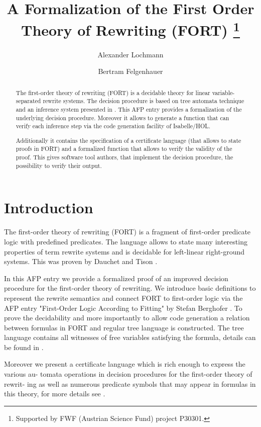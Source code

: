 \documentclass[11pt,a4paper]{article}
\begin{document}
\title{A Formalization of the First Order Theory of Rewriting (FORT) \footnote{Supported by FWF (Austrian Science Fund) project P30301.}}
\author{Alexander Lochmann \and Bertram Felgenhauer}
\maketitle

\begin{abstract}
The first-order theory of rewriting (FORT) is a decidable theory for
linear variable-separated rewrite systems. The decision
procedure is based on tree automata technique and an inference system presented in \cite{MLMF21}.
This AFP entry provides a formalization of the underlying decision procedure.
Moreover it allows to generate a function that can verify each inference step via the
code generation facility of Isabelle/HOL.

Additionally it contains the specification of a certificate language
(that allows to state proofs in FORT) and a formalized function that
allows to verify the validity of the proof.
This gives software tool authors, that implement the decision procedure,
the possibility to verify their output.
\end{abstract}

\tableofcontents

\section{Introduction}

The first-order theory of rewriting (FORT) is a fragment of
first-order predicate logic with predefined predicates.
The language allows to state many interesting properties of
term rewrite systems and is decidable for left-linear right-ground systems.
This was proven by Dauchet and Tison \cite{DT90}.

In this AFP entry we provide a formalized proof of an improved decision procedure
for the first-order theory of rewriting. We introduce basic definitions to
represent the rewrite semantics and connect FORT to first-order logic
via the AFP entry "First-Order Logic According to Fitting" by Stefan Berghofer \cite{B07}.
To prove the decidability and more importantly to allow code generation a relation between
formulas in FORT and regular tree language is constructed. The tree language
contains all witnesses of free variables satisfying the formula, details can be found in \cite{LMMF21}.

Moreover we present a certificate language which is rich enough to express the various au-
tomata operations in decision procedures for the first-order theory of rewrit-
ing as well as numerous predicate symbols that may appear in formulas in
this theory, for more details see \cite{MLMF21}.





\end{document}
